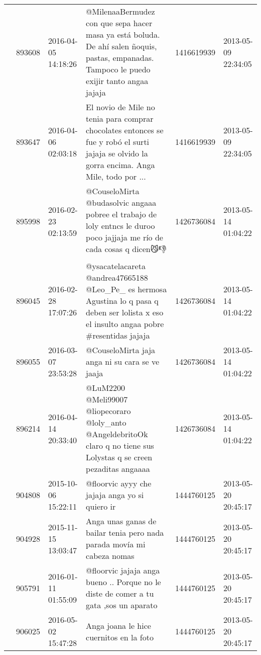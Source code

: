 \begin{tabular}{llllrl}
           & 893608  & 2016-04-05 14:18:26 &  @MilenaaBermudez con que sepa hacer masa ya está boluda. De ahí salen ñoquis, pastas, empanadas. Tampoco le puedo exijir tanto angaa jajaja &  1416619939 & 2013-05-09 22:34:05 \\
           & 893647  & 2016-04-06 02:03:18 &  El novio de Mile no tenia para comprar chocolates entonces se fue y robó el surti jajaja se olvido la gorra encima. Anga Mile, todo por ... &  1416619939 & 2013-05-09 22:34:05 \\
           & 895998  & 2016-02-23 02:13:59 &                       @CouseloMirta @budasolvic angaaa pobree el trabajo de loly entncs le duroo poco jajjaja me río de cada cosas q dicen😼👎 &  1426736084 & 2013-05-14 01:04:22 \\
           & 896045  & 2016-02-28 17:07:26 &  @ysacatelacareta @andrea47665188 @Leo\_Pe\_ es hermosa Agustina lo q pasa q deben ser lolista x eso el insulto angaa pobre \#resentidas jajaja &  1426736084 & 2013-05-14 01:04:22 \\
           & 896055  & 2016-03-07 23:53:28 &                                                                                               @CouseloMirta jaja anga ni su cara se ve jaaja &  1426736084 & 2013-05-14 01:04:22 \\
           & 896214  & 2016-04-14 20:33:40 &                      @LuM2200 @Meli99007 @liopecoraro @loly\_anto @AngeldebritoOk  claro q no tiene sus Lolystas q se creen pezaditas angaaaa &  1426736084 & 2013-05-14 01:04:22 \\
           & 904808  & 2015-10-06 15:22:11 &                                                                                              @floorvic  ayyy che jajaja anga yo si quiero ir &  1444760125 & 2013-05-20 20:45:17 \\
           & 904928  & 2015-11-15 13:03:47 &                                                                      Anga  unas ganas de bailar tenia pero nada parada movía mi cabeza nomas &  1444760125 & 2013-05-20 20:45:17 \\
           & 905791  & 2016-01-11 01:55:09 &                                                        @floorvic  jajaja anga bueno .. Porque no le diste de comer a tu gata ,sos un aparato &  1444760125 & 2013-05-20 20:45:17 \\
           & 906025  & 2016-05-02 15:47:28 &                                                                                                      Anga joana le hice cuernitos en la foto &  1444760125 & 2013-05-20 20:45:17 \\

\end{tabular}
